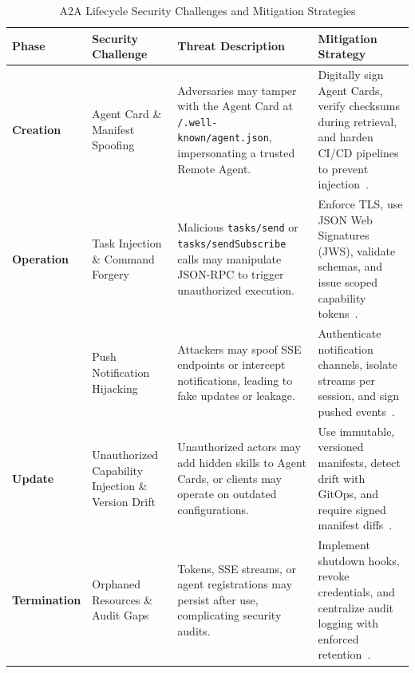 \documentclass{article}
\begin{document}
\begin{table}[ht]
   \small
  \centering
  \renewcommand{\arraystretch}{1.2}
  \captionsetup{justification=centering}
  \caption{A2A Lifecycle Security Challenges and Mitigation Strategies}
  \label{tab:a2a-security-mitigations}
\begin{tabularx}{\textwidth}{|
    >{\centering\arraybackslash}p{2.1cm}|
    >{\raggedright\arraybackslash}X|
    >{\raggedright\arraybackslash}X|
    >{\raggedright\arraybackslash}X|}

    \hline
    \rowcolor{gray!30}
    \textbf{Phase} & \textbf{Security Challenge} & \textbf{Threat Description} & \textbf{Mitigation Strategy} \\
    \hline

    \textbf{Creation}
    & Agent Card \& Manifest Spoofing
    & Adversaries may tamper with the Agent Card at \texttt{/.well-known/agent.json}, impersonating a trusted Remote Agent.
    & Digitally sign Agent Cards, verify checksums during retrieval, and harden CI/CD pipelines to prevent injection~\cite{google2024a2a}. \\

    \hline

    \textbf{Operation}
    & Task Injection \& Command Forgery
    & Malicious \texttt{tasks/send} or \texttt{tasks/sendSubscribe} calls may manipulate JSON-RPC to trigger unauthorized execution.
    & Enforce TLS, use JSON Web Signatures (JWS), validate schemas, and issue scoped capability tokens~\cite{redteaming2025}. \\

    & Push Notification Hijacking
    & Attackers may spoof SSE endpoints or intercept notifications, leading to fake updates or leakage.
    & Authenticate notification channels, isolate streams per session, and sign pushed events~\cite{firewalls2025}. \\

    \hline

    \textbf{Update}
    & Unauthorized Capability Injection \& Version Drift
    & Unauthorized actors may add hidden skills to Agent Cards, or clients may operate on outdated configurations.
    & Use immutable, versioned manifests, detect drift with GitOps, and require signed manifest diffs~\cite{mediumA2A2025}. \\

    \hline

    \textbf{Termination}
    & Orphaned Resources \& Audit Gaps
    & Tokens, SSE streams, or agent registrations may persist after use, complicating security audits.
    & Implement shutdown hooks, revoke credentials, and centralize audit logging with enforced retention~\cite{googleA2aBlog}. \\

    \hline
  \end{tabularx}
\end{table}
\end{document}
